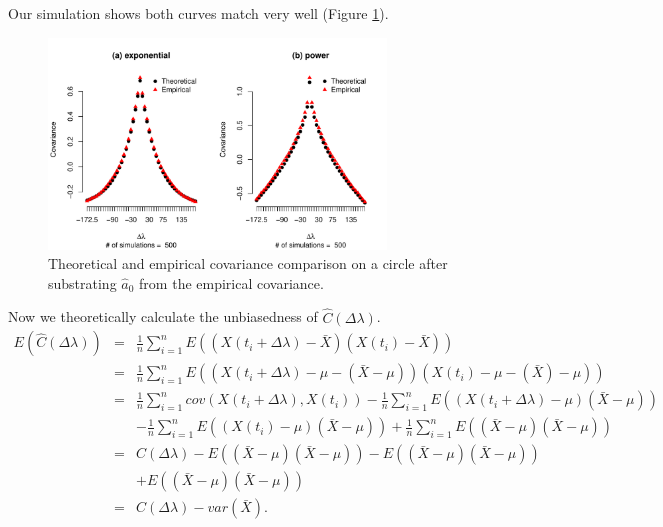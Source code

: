 Our simulation shows both curves match very well (Figure \ref{covariance_estimate_a0}).
	
	\begin{figure}[H]
	 \centering
	 \includegraphics[width=0.8\textwidth]{graphs/covarince_circle_estimate_a0}
	 \caption[Theoretical and Empirical Covariance Comparison on a Circle After]{Theoretical and empirical covariance comparison on a circle after substrating $\hat{a}_0$ from the empirical covariance.}
	 \label{covariance_estimate_a0}
	 \end{figure}
Now we theoretically calculate the unbiasedness of $\hat{C}(\Delta \lambda)$.
\begin{eqnarray*}
	E(\hat{C}(\Delta \lambda)) &=& \frac{1}{n}\sum_{i = 1}^n E((X(t_i + \Delta \lambda) - \bar{X})(X(t_i) - \bar{X})) \\
	&=& \frac{1}{n}\sum_{i = 1}^n E((X(t_i + \Delta \lambda) - \mu - (\bar{X} - \mu))(X(t_i) -\mu - (\bar{X}) - \mu)) \\
	&=& \frac{1}{n}\sum_{i=1}^n cov(X(t_i+\Delta \lambda), X(t_i)) - \frac{1}{n}\sum_{i = 1}^n E((X(t_i + \Delta \lambda) - \mu)(\bar{X} - \mu)) \\
	& & -\frac{1}{n}\sum_{i = 1}^n E((X(t_i) - \mu)(\bar{X} - \mu)) + \frac{1}{n}\sum_{i = 1}^n E((\bar{X} - \mu)(\bar{X} - \mu)) \\
	&=& C(\Delta \lambda) -E((\bar{X} - \mu)(\bar{X} - \mu)) - E((\bar{X} - \mu)(\bar{X} - \mu)) \\
	& & + E((\bar{X} - \mu)(\bar{X} - \mu)) \\
	&=& C(\Delta \lambda) - var(\bar{X}).
\end{eqnarray*}
